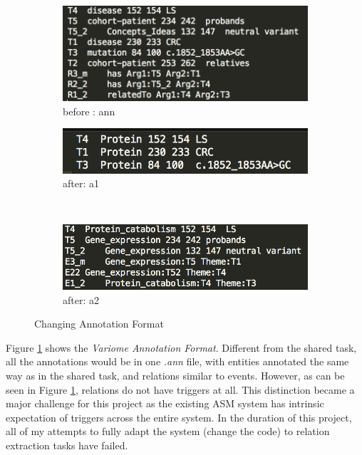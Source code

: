 \begin{figure}[h]
	\centering
	\begin{subfigure}[b]{0.3\textwidth}
		\includegraphics[width=\textwidth]{ann}
		\caption{before	: ann}
		\label{fig:ann}
	\end{subfigure}             
	\vfill
	\begin{subfigure}[b]{0.3\textwidth}
		\includegraphics[width=\textwidth]{a1}
		\caption{after: a1}
		\label{fig:a1}   
	\end{subfigure}
	~
	\begin{subfigure}[b]{0.3\textwidth}
		\includegraphics[width=\textwidth]{a2}
		\caption{after: a2}
		\label{fig:a2}   
	\end{subfigure}  
	\caption{Changing Annotation Format}
	\label{fig:annotation_format}
\end{figure}
Figure \ref{fig:ann} shows the \emph{Variome Annotation Format}. Different from the shared task, all the annotations would be in one \emph{.ann} file, with entities annotated the same way as in the shared task, and relations similar to events. However, as can be seen in Figure \ref{fig:ann}, relations do not have triggers at all. This distinction became a major challenge for this project as the existing ASM system has intrinsic expectation of triggers across the entire system. In the duration of this project, all of my attempts to fully adapt the system (change the code) to relation extraction tasks have failed.\newline\newline

